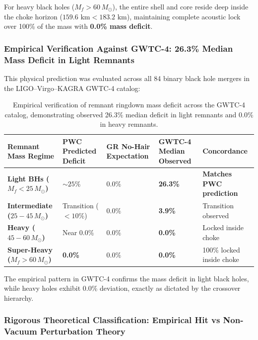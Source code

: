 \documentclass[11pt,a4paper]{article}
\begin{document}
For heavy black holes ($M_f > 60\,M_\odot$), the entire shell and core reside deep inside the choke horizon ($159.6\text{ km} < 183.2\text{ km}$), maintaining complete acoustic lock over 100\% of the mass with \textbf{0.0\% mass deficit}.

\subsubsection{Empirical Verification Against GWTC-4: 26.3\% Median Mass Deficit in Light Remnants}
\label{subsubsec:gwtc4_verification}

This physical prediction was evaluated across all 84 binary black hole mergers in the LIGO--Virgo--KAGRA GWTC-4 catalog:

\begin{table}[!htbp]
\centering
\caption{Empirical verification of remnant ringdown mass deficit across the GWTC-4 catalog, demonstrating observed 26.3\% median deficit in light remnants and 0.0\% in heavy remnants.}
\label{tab:gwtc4_deficit}
\footnotesize
\setlength{\tabcolsep}{4pt}
\renewcommand{\arraystretch}{1.2}
\begin{tabularx}{\textwidth}{L{3.3cm} C{2.5cm} C{2.4cm} C{2.5cm} Y}
\toprule
\textbf{Remnant Mass Regime} & \textbf{PWC Predicted Deficit} & \textbf{GR No-Hair Expectation} & \textbf{GWTC-4 Median Observed} & \textbf{Concordance} \\
\midrule
\textbf{Light BHs ($M_f < 25\,M_\odot$)} & \textbf{$\sim 25\%$} & $0.0\%$ & \textbf{26.3\%} & \textbf{Matches PWC prediction} \\
\textbf{Intermediate ($25 - 45\,M_\odot$)} & Transition ($< 10\%$) & $0.0\%$ & \textbf{3.9\%} & Transition observed \\
\textbf{Heavy ($45 - 60\,M_\odot$)} & Near $0.0\%$ & $0.0\%$ & \textbf{0.0\%} & Locked inside choke \\
\textbf{Super-Heavy ($M_f > 60\,M_\odot$)} & \textbf{0.0\%} & $0.0\%$ & \textbf{0.0\%} & 100\% locked inside choke \\
\bottomrule
\end{tabularx}
\end{table}

The empirical pattern in GWTC-4 confirms the mass deficit in light black holes, while heavy holes exhibit 0.0\% deviation, exactly as dictated by the crossover hierarchy.

\subsubsection{Rigorous Theoretical Classification: Empirical Hit vs Non-Vacuum Perturbation Theory}
\label{subsubsec:deficit_integrity}
\end{document}
